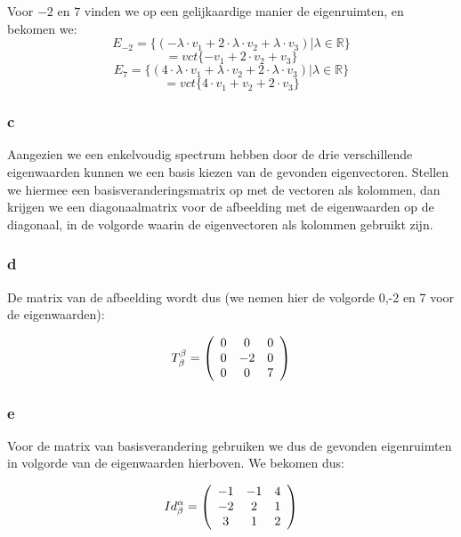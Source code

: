 \documentclass[lineaire_algebra_oplossingen.tex]{subfiles}
\begin{document}
Voor $-2$ en $7$ vinden we op een gelijkaardige manier de eigenruimten, en bekomen we:
\[E_{-2} = \{(-\lambda \cdot v_1+2 \cdot \lambda \cdot v_2+\lambda \cdot v_3)|\lambda\in\mathbb{R}\}\]
\[=vct\{-v_1+2 \cdot v_2+v_3\}\]
\[E_{7} = \{(4\cdot\lambda \cdot v_1+\lambda \cdot v_2+2 \cdot \lambda \cdot v_3)|\lambda\in\mathbb{R}\}\]
\[=vct\{4 \cdot v_1+v_2+ 2 \cdot v_3\}\]

\subsubsection*{c}

Aangezien we een enkelvoudig spectrum hebben door de drie verschillende eigenwaarden kunnen we een basis kiezen van de gevonden eigenvectoren. Stellen we hiermee een basisveranderingsmatrix op met de vectoren als kolommen, dan krijgen we een diagonaalmatrix voor de afbeelding met de eigenwaarden op de diagonaal, in de volgorde waarin de eigenvectoren als kolommen gebruikt zijn.

\subsubsection*{d}

De matrix van de afbeelding wordt dus (we nemen hier de volgorde 0,-2 en 7 voor de eigenwaarden):

\[
T^\beta_\beta = \left(
\begin{array}{c c c}
0 & 0 & 0 \\
0 & -2 & 0 \\
0 & 0 & 7 \\
\end{array}
\right)
\]

\subsubsection*{e}

Voor de matrix van basisverandering gebruiken we dus de gevonden eigenruimten in volgorde van de eigenwaarden hierboven. We bekomen dus:

\[
Id^\alpha_\beta = \left(
\begin{array}{c c c}
-1 & -1 & 4 \\
-2 & 2 & 1 \\
3 & 1 & 2 \\
\end{array}
\right)
\]
\end{document}
